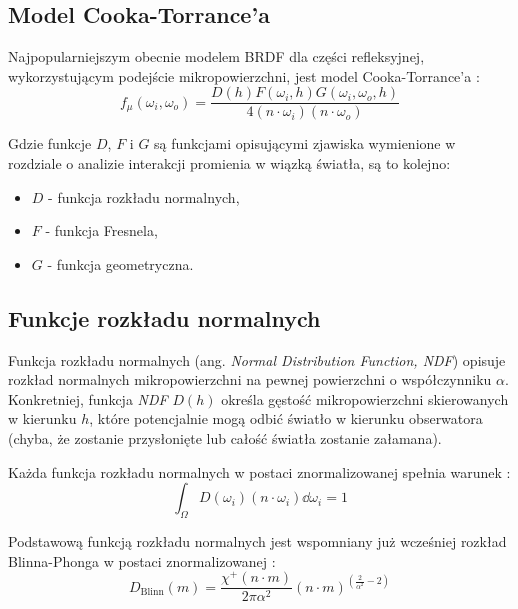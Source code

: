 \documentclass[../main.tex]{subfiles}
\begin{document}
\subsection{Model Cooka-Torrance'a}

Najpopularniejszym obecnie modelem BRDF dla części refleksyjnej, wykorzystującym podejście mikropowierzchni, jest model Cooka-Torrance'a \cite{CookTorrance}:
\begin{equation}
  f_{\mu}(\omega_i, \omega_o) = \frac{
    D(h) F(\omega_i, h) G(\omega_i, \omega_o, h)
  }{
    4 (n \cdot \omega_i) (n \cdot \omega_o)
  }
\end{equation}

Gdzie funkcje $D$, $F$ i $G$ są funkcjami opisującymi zjawiska wymienione w rozdziale o analizie interakcji promienia w wiązką światła, są to kolejno:

\begin{itemize}
  \item $D$ - funkcja rozkładu normalnych,
  \item $F$ - funkcja Fresnela,
  \item $G$ - funkcja geometryczna.
\end{itemize}

\subsection{Funkcje rozkładu normalnych}

Funkcja rozkładu normalnych (ang. \textit{Normal Distribution Function, NDF})
opisuje rozkład normalnych mikropowierzchni na pewnej powierzchni o
współczynniku $\alpha$. Konkretniej, funkcja \textit{NDF} $D(h)$ określa
gęstość mikropowierzchni skierowanych w kierunku $h$, które potencjalnie mogą
odbić światło w kierunku obserwatora (chyba, że zostanie przysłonięte lub
całość światła zostanie załamana).

Każda funkcja rozkładu normalnych w postaci znormalizowanej spełnia warunek \cite{NDFReed}:
\begin{equation}
  \int_{\Omega} {
    D(\omega_i)
    (n \cdot \omega_i)
    \dd \omega_i
  } = 1
\end{equation}

Podstawową funkcją rozkładu normalnych jest wspomniany już wcześniej rozkład
Blinna-Phonga w postaci znormalizowanej \cite{SpecularBRDFReference}:
\begin{equation}
  D_{\text{Blinn}}(m) =
    \frac{\chi^{+}(n \cdot m)}{2\pi\alpha^2}
    (n \cdot m)^{(\frac{2}{\alpha^2} - 2)}
\end{equation}
\end{document}
